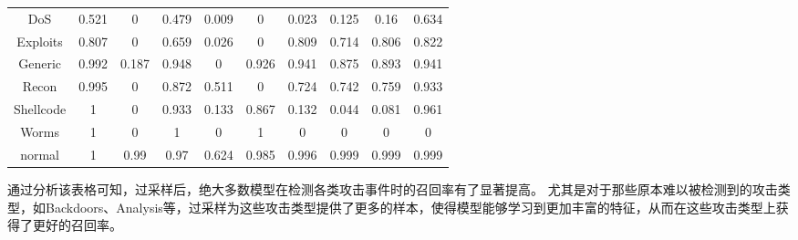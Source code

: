 \begin{table}[htbp]
\begin{tabular}{cccccccccc}
		DoS       & 0.521 & 0     & 0.479 & 0.009 & 0     & 0.023 & 0.125 & 0.16   & 0.634 \\
		Exploits  & 0.807 & 0     & 0.659 & 0.026 & 0     & 0.809 & 0.714 & 0.806  & 0.822 \\
		Generic   & 0.992 & 0.187 & 0.948 & 0     & 0.926 & 0.941 & 0.875 & 0.893  & 0.941 \\
		Recon     & 0.995 & 0     & 0.872 & 0.511 & 0     & 0.724 & 0.742 & 0.759  & 0.933 \\
		Shellcode & 1     & 0     & 0.933 & 0.133 & 0.867 & 0.132 & 0.044 & 0.081  & 0.961 \\
		Worms     & 1     & 0     & 1     & 0     & 1     & 0     & 0     & 0      & 0     \\
		normal    & 1     & 0.99  & 0.97  & 0.624 & 0.985 & 0.996 & 0.999 & 0.999  & 0.999 \\
		\bottomrule
	\end{tabular}
\end{table}
通过分析该表格可知，过采样后，绝大多数模型在检测各类攻击事件时的召回率有了显著提高。
尤其是对于那些原本难以被检测到的攻击类型，如Backdoors、Analysis等，过采样为这些攻击类型提供了更多的样本，使得模型能够学习到更加丰富的特征，从而在这些攻击类型上获得了更好的召回率。\par

